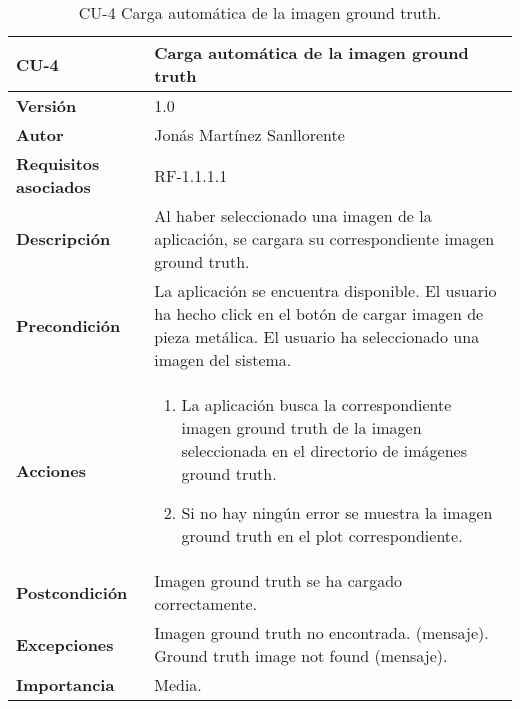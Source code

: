 \begin{table}[p]
	\centering
	\begin{tabularx}{\linewidth}{ p{} p{} }
		\toprule
		\textbf{CU-4}    & \textbf{Carga automática de la imagen ground truth}\\
		\toprule
		\textbf{Versión}              & 1.0    \\
		\textbf{Autor}                & Jonás Martínez Sanllorente \\
		\textbf{Requisitos asociados} & RF-1.1.1.1 \\
		\textbf{Descripción}          & Al haber seleccionado una imagen de la aplicación, se cargara su correspondiente imagen ground truth.\\
		\textbf{Precondición}         & La aplicación se encuentra disponible.\newline
                                        El usuario ha hecho click en el botón de cargar imagen de pieza metálica.\newline
                                        El usuario ha seleccionado una imagen del sistema. \\
		\textbf{Acciones}             &
		\begin{enumerate}
			\def\labelenumi{\arabic{enumi}.}
			\tightlist
			\item La aplicación busca la correspondiente imagen ground truth de la imagen seleccionada en el directorio de imágenes ground truth.
			\item Si no hay ningún error se muestra la imagen ground truth en el plot correspondiente.
		\end{enumerate}\\
		\textbf{Postcondición}        & Imagen ground truth se ha cargado correctamente. \\
		\textbf{Excepciones}          & Imagen ground truth no encontrada. (mensaje).\newline
                                        Ground truth image not found (mensaje). \\
		\textbf{Importancia}          & Media. \\
		\bottomrule
	\end{tabularx}
	\caption{CU-4 Carga automática de la imagen ground truth.}
\end{table}

